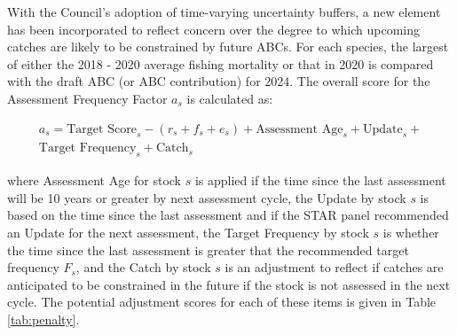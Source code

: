 \documentclass[11pt,
  english,
  a4paper,
]{article}
\begin{document}
\leavevmode\tagmcend\tagstructend\par


With the Council's adoption of time-varying uncertainty buffers, a new element has been incorporated to reflect concern over the degree to which upcoming catches are likely to be constrained by future ABCs. For each species, the largest of either the 2018 - 2020 average fishing mortality or that in 2020 is compared with the draft ABC (or ABC contribution) for 2024. The overall score for the Assessment Frequency Factor {\(a_s\)\leavevmode\tagmcend\tagstructend} is calculated as:

\leavevmode\tagmcend\tagstructend\par


{\[
\begin{aligned}
a_s = \text{Target Score}_s - (r_s + f_s + e_s) + \text{Assessment Age}_s + \text{Update}_s + \\
\text{Target Frequency}_s + \text{Catch}_s
\end{aligned}
\]\leavevmode\tagmcend\tagstructend}

\leavevmode\tagmcend\tagstructend\par


where Assessment Age for stock {\(s\)\leavevmode\tagmcend\tagstructend} is applied if the time since the last assessment will be 10 years or greater by next assessment cycle, the Update by stock {\(s\)\leavevmode\tagmcend\tagstructend} is based on the time since the last assessment and if the STAR panel recommended an Update for the next assessment, the Target Frequency by stock {\(s\)\leavevmode\tagmcend\tagstructend} is whether the time since the last assessment is greater that the recommended target frequency {\(F_s\)\leavevmode\tagmcend\tagstructend}, and the Catch by stock {\(s\)\leavevmode\tagmcend\tagstructend} is an adjustment to reflect if catches are anticipated to be constrained in the future if the stock is not assessed in the next cycle. The potential adjustment scores for each of these items is given in Table \ref{tab:penalty}.
\end{document}
